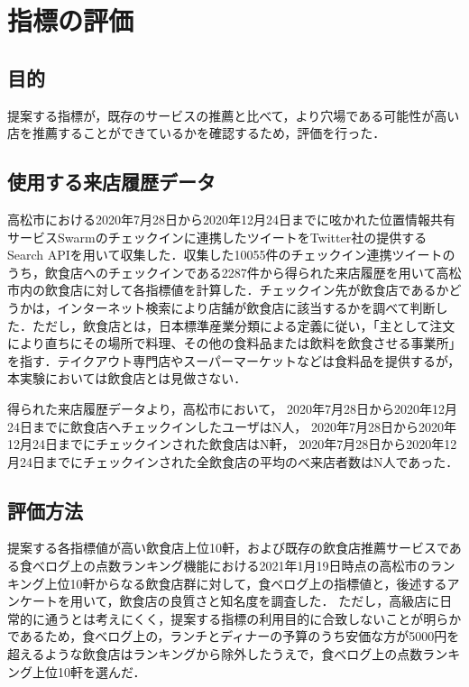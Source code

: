 \chapter{指標の評価}



\label{chap:experiment}

\section{目的}
提案する指標が，既存のサービスの推薦と比べて，より穴場である可能性が高い店を推薦することができているかを確認するため，評価を行った．

\section{使用する来店履歴データ}
高松市における2020年7月28日から2020年12月24日までに呟かれた位置情報共有サービスSwarmのチェックインに連携したツイートをTwitter社の提供するSearch APIを用いて収集した．収集した10055件のチェックイン連携ツイートのうち，飲食店へのチェックインである2287件から得られた来店履歴を用いて高松市内の飲食店に対して各指標値を計算した．チェックイン先が飲食店であるかどうかは，インターネット検索により店舗が飲食店に該当するかを調べて判断した．ただし，飲食店とは，日本標準産業分類による定義\cite{restaurant}に従い，「主として注文により直ちにその場所で料理、その他の食料品または飲料を飲食させる事業所」を指す．テイクアウト専門店やスーパーマーケットなどは食料品を提供するが，本実験においては飲食店とは見做さない．\par
得られた来店履歴データより，高松市において，
2020年7月28日から2020年12月24日までに飲食店へチェックインしたユーザはN人，
2020年7月28日から2020年12月24日までにチェックインされた飲食店はN軒，
2020年7月28日から2020年12月24日までにチェックインされた全飲食店の平均のべ来店者数はN人であった．

\section{評価方法}
提案する各指標値が高い飲食店上位10軒，および既存の飲食店推薦サービスである食べログ上の点数ランキング機能における2021年1月19日時点の高松市のランキング上位10軒からなる飲食店群に対して，食べログ上の指標値と，後述するアンケートを用いて，飲食店の良質さと知名度を調査した．
ただし，高級店に日常的に通うとは考えにくく，提案する指標の利用目的に合致しないことが明らかであるため，食べログ上の，ランチとディナーの予算のうち安価な方が5000円を超えるような飲食店はランキングから除外したうえで，食べログ上の点数ランキング上位10軒を選んだ．
